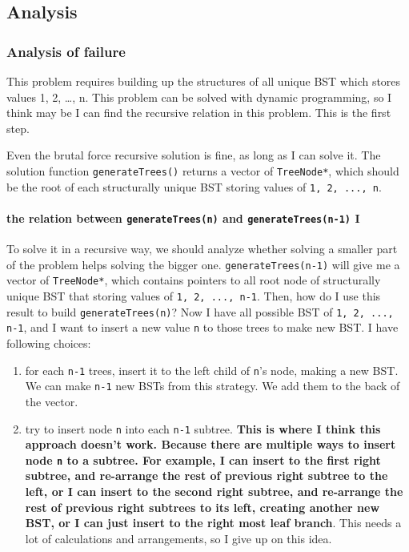 \documentclass[11pt]{article}
\begin{document}
\subsection{Analysis}
\label{sec:org070f2f2}
\subsubsection{Analysis of failure}
\label{sec:orgf85f724}
This problem requires building up the structures of all unique BST which stores values 1, 2, \ldots{}, n. This problem can be solved with dynamic programming, so I think may be I can find the recursive relation in this problem. This is the first step.

Even the brutal force recursive solution is fine, as long as I can solve it. The solution function \texttt{generateTrees()} returns a vector of \texttt{TreeNode*}, which should be the root of each structurally unique BST storing values of \texttt{1, 2, ..., n}.
\paragraph{the relation between \texttt{generateTrees(n)} and \texttt{generateTrees(n-1)} I}
\label{sec:orgacd964b}

To solve it in a recursive way, we should analyze whether solving a smaller part of the problem helps solving the bigger one. \texttt{generateTrees(n-1)} will give me a vector of \texttt{TreeNode*}, which contains pointers to all root node of structurally unique BST that storing values of \texttt{1, 2, ..., n-1}. Then, how do I use this result to build \texttt{generateTrees(n)}? Now I have all possible BST of \texttt{1, 2, ..., n-1}, and I want to insert a new value \texttt{n} to those trees to make new BST. I have following choices:
\begin{enumerate}
\item for each \texttt{n-1} trees, insert it to the left child of \texttt{n}'s node, making a new BST. We can make \texttt{n-1} new BSTs from this strategy. We add them to the back of the vector.
\item try to insert node \texttt{n} into each \texttt{n-1} subtree. \textbf{This is where I think this approach doesn't work. Because there are multiple ways to insert node \texttt{n} to a subtree. For example, I can insert to the first right subtree, and re-arrange the rest of previous right subtree to the left, or I can insert to the second right subtree, and re-arrange the rest of previous right subtrees to its left, creating another new BST, or I can just insert to the right most leaf branch}. This needs a lot of calculations and arrangements, so I give up on this idea.
\end{enumerate}
\end{document}
